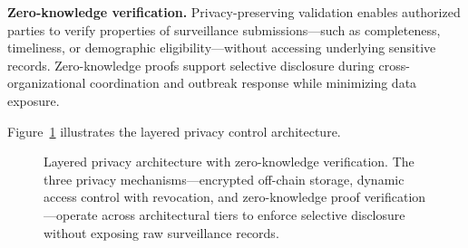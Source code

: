 \textbf{Zero-knowledge verification.} Privacy-preserving validation enables authorized parties to verify properties of surveillance submissions---such as completeness, timeliness, or demographic eligibility---without accessing underlying sensitive records. Zero-knowledge proofs support selective disclosure during cross-organizational coordination and outbreak response while minimizing data exposure.

Figure~\ref{fig:privacy} illustrates the layered privacy control architecture.

\begin{figure}[!ht]
\centering
{}
\caption{Layered privacy architecture with zero-knowledge verification. The three privacy mechanisms---encrypted off-chain storage, dynamic access control with revocation, and zero-knowledge proof verification---operate across architectural tiers to enforce selective disclosure without exposing raw surveillance records.}\label{fig:privacy}
\end{figure}

%
%
%

